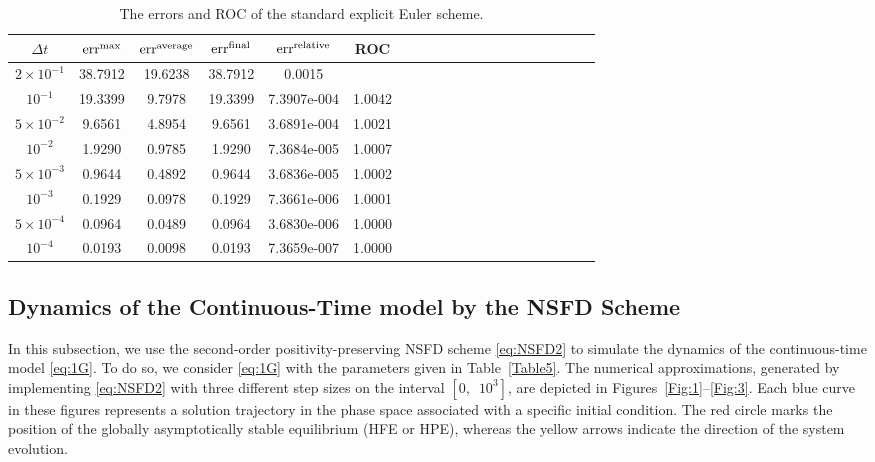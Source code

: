 \documentclass[11pt]{article}
\theoremstyle{definition}
\theoremstyle{remark}
\numberwithin{equation}{section}
\DeclareMathOperator{\err}{err}
\begin{document}
\begin{table}[htb]
\centering
\caption{The errors and ROC of the standard explicit Euler scheme.}\label{Table4}
\begin{tabular}{cccccccccccccccccccc}
\hline
$\Delta t$ & $\err^{\rm max}$ & $\err^{\rm average}$ & $\err^{\rm final}$ & $\err^{\rm relative}$ & ROC \\
\hline
$2 \times 10^{-1}$ &  38.7912 & 19.6238 & 38.7912 & 0.0015 &\\
$10^{-1}$ & 19.3399 & 9.7978 & 19.3399 & 7.3907e-004 & 1.0042 \\
$5 \times 10^{-2}$ &  9.6561 & 4.8954 &  9.6561 & 3.6891e-004 & 1.0021\\
$10^{-2}$ &  1.9290 & 0.9785 & 1.9290 & 7.3684e-005 &   1.0007 \\
$5 \times 10^{-3}$ &  0.9644 & 0.4892 &  0.9644 & 3.6836e-005 & 1.0002\\
$10^{-3}$ & 0.1929 & 0.0978 & 0.1929 & 7.3661e-006 & 1.0001\\
$5 \times 10^{-4}$ &  0.0964 & 0.0489 &  0.0964 & 3.6830e-006 & 1.0000\\
$10^{-4}$ & 0.0193 & 0.0098 & 0.0193 & 7.3659e-007 & 1.0000\\
\hline
\end{tabular}
\end{table}

\subsection{Dynamics of the Continuous-Time model by the NSFD Scheme}\label{Subsec4.2}
In this subsection, we use the second-order positivity-preserving NSFD scheme \eqref{eq:NSFD2} to simulate the dynamics of the continuous-time model \eqref{eq:1G}.
To do so, we consider \eqref{eq:1G} with the parameters given in Table~\ref{Table5}.
The numerical approximations, generated by implementing \eqref{eq:NSFD2} with three different step sizes on the interval $[0,\,\,\,10^3]$, are depicted in Figures~\ref{Fig:1}--\ref{Fig:3}. 
Each blue curve in these figures represents a solution trajectory in the phase space associated with a specific initial condition. 
The red circle marks the position of the globally asymptotically stable equilibrium (HFE or HPE), whereas the yellow arrows indicate the direction of the system evolution.
\end{document}
